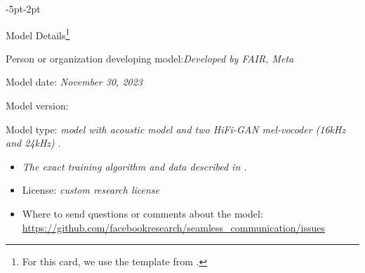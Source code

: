 \newpage
\begin{adjustwidth}{-5pt}{-2pt}
\begin{singlespace}
\begin{tcolorbox}[title=\textbf{\section{Model Card - \seamlessexpressive}\label{card:seamlessexpress}},
    breakable, sharp corners, boxrule=0.5pt] 
\begin{mcsection}{Model Details\footnote{For this card, we use the template from \cite{10.1145/3287560.3287596}.}} 
\item Person or organization developing model:\textit{Developed by FAIR, Meta}
\item Model date: \textit{November 30, 2023}
\item Model version: \seamlessexpressive
\item Model type:
\textit{\prosodyunitytwo model with \ptv acoustic model and two HiFi-GAN mel-vocoder (16kHz and 24kHz) }.
\begin{itemize}
    \item \it The exact training algorithm and data described in . 
\item License: \textit{custom research license}
\item Where to send questions or comments about the model: \\
\url{https://github.com/facebookresearch/seamless_communication/issues}
\end{itemize} 
\end{mcsection}



\end{tcolorbox}
\end{singlespace}
\end{adjustwidth}
